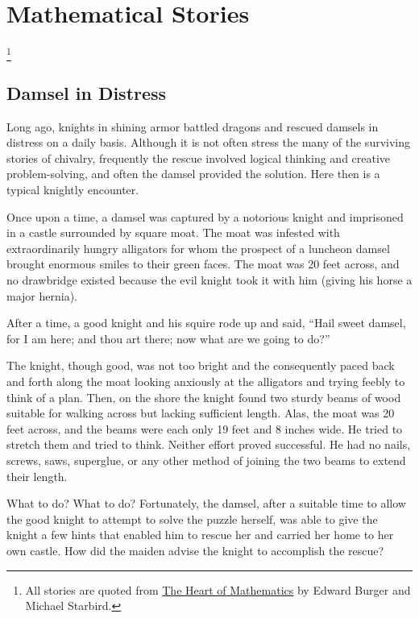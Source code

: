 \section{Mathematical Stories}\footnote{All stories are quoted from \underline{The Heart of Mathematics} by Edward Burger and Michael Starbird.} \label{sec:Stories}

\newif\ifnudges

\subsection{Damsel in Distress}

Long ago, knights in shining armor battled dragons and rescued damsels in distress on a daily basis. Although it is not often stress the many of the surviving stories of chivalry, frequently the rescue involved logical thinking and creative problem-solving, and often the damsel provided the solution. Here then is a typical knightly encounter.

Once upon a time, a damsel was captured by a notorious knight and imprisoned in a castle surrounded by square moat. The moat was infested with extraordinarily hungry alligators for whom the prospect of a luncheon damsel brought enormous smiles to their green faces. The moat was 20 feet across, and no drawbridge existed because the evil knight took it with him (giving his horse a major hernia).

After a time, a good knight and his squire rode up and said, ``Hail sweet damsel, for I am here; and thou art there; now what are we going to do?''

The knight, though good, was not too bright and the consequently paced back and forth along the moat looking anxiously at the alligators and trying feebly to think of a plan. Then, on the shore the knight found two sturdy beams of wood suitable for walking across but lacking sufficient length. Alas, the moat was 20 feet across, and the beams were each only 19 feet and 8 inches wide. He tried to stretch them and tried to think. Neither effort proved successful. He had no nails, screws, saws, superglue, or any other method of joining the two beams to extend their length.

What to do? What to do? Fortunately, the damsel, after a suitable time to allow the good knight to attempt to solve the puzzle herself, was able to give the knight a few hints that enabled him to rescue her and carried her home to her own castle. How did the maiden advise the knight to accomplish the rescue?

